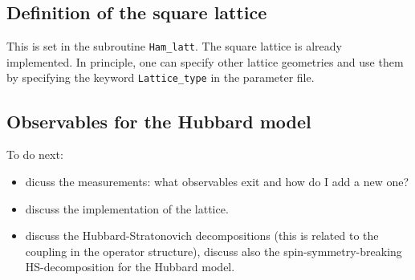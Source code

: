 \subsection{Definition of the square lattice}
This is set in the subroutine \texttt{Ham\_latt}.
The square lattice is already implemented. In principle, one can specify other lattice geometries and use them by specifying the keyword \texttt{Lattice\_type} in the parameter file.



\subsection{Observables for the Hubbard model}


To do next:
\begin{itemize}
\item dicuss the measurements: what observables exit and how do I add a new one?
\item  discuss the implementation of the lattice.
\item discuss the Hubbard-Stratonovich decompositions (this is related to the coupling in the operator structure), discuss also the spin-symmetry-breaking HS-decomposition for the Hubbard model.
\end{itemize}

